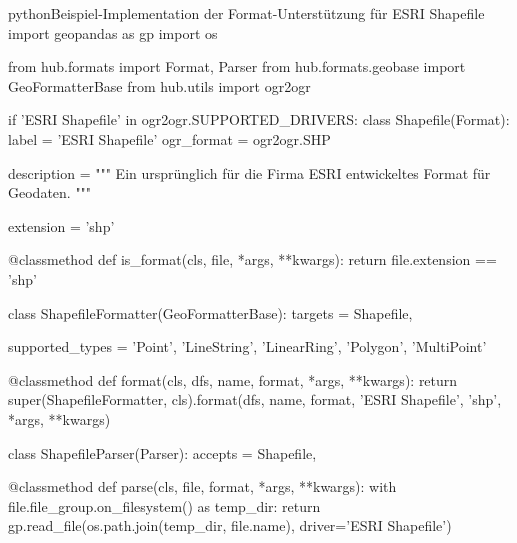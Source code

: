 \begin{srclst}[label=src:pd:format-example]{python}{Beispiel-Implementation der Format-Unterstützung für ESRI Shapefile}
import geopandas as gp
import os

from hub.formats import Format, Parser
from hub.formats.geobase import GeoFormatterBase
from hub.utils import ogr2ogr

if 'ESRI Shapefile' in ogr2ogr.SUPPORTED_DRIVERS:
    class Shapefile(Format):
        label = 'ESRI Shapefile'
        ogr_format = ogr2ogr.SHP

        description = """
        Ein ursprünglich für die Firma ESRI entwickeltes Format für Geodaten.
        """

        extension = 'shp'

        @classmethod
        def is_format(cls, file, *args, **kwargs):
            return file.extension == 'shp'

    class ShapefileFormatter(GeoFormatterBase):
        targets = Shapefile,

        supported_types = {'Point', 'LineString', 'LinearRing', 'Polygon', 'MultiPoint'}

        @classmethod
        def format(cls, dfs, name, format, *args, **kwargs):
            return super(ShapefileFormatter, cls).format(dfs, name, format, 'ESRI Shapefile', 'shp', *args, **kwargs)

    class ShapefileParser(Parser):
        accepts = Shapefile,

        @classmethod
        def parse(cls, file, format, *args, **kwargs):
            with file.file_group.on_filesystem() as temp_dir:
                return gp.read_file(os.path.join(temp_dir, file.name), driver='ESRI Shapefile')
\end{srclst}